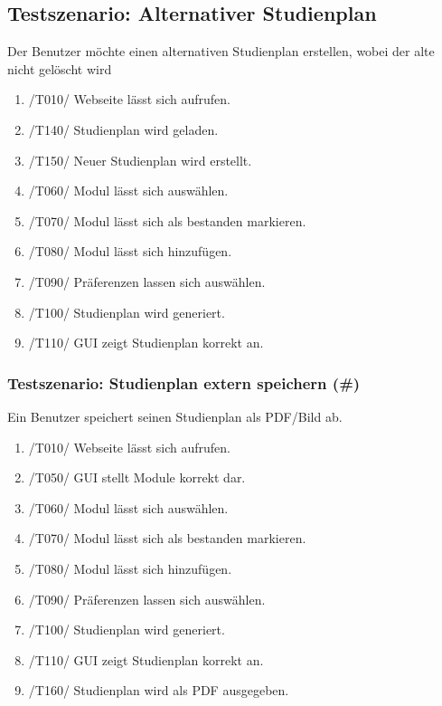 \documentclass[parskip=full]{scrartcl}
\begin{document}
		\subsection{Testszenario: Alternativer Studienplan}
		
			Der Benutzer möchte einen alternativen Studienplan erstellen, wobei der alte nicht gelöscht wird

			\begin{enumerate}
				\item /T010/ Webseite lässt sich aufrufen.
				\item /T140/ Studienplan wird geladen.
				\item /T150/ Neuer Studienplan wird erstellt.
				\item /T060/ Modul lässt sich auswählen.
				\item /T070/ Modul lässt sich als bestanden markieren.
				\item /T080/ Modul lässt sich hinzufügen.
				\item /T090/ Präferenzen lassen sich auswählen.
				\item /T100/ Studienplan wird generiert.
				\item /T110/ GUI zeigt Studienplan korrekt an.
			\end{enumerate}
			
		\subsubsection{Testszenario: Studienplan extern speichern (\#)}
	
			Ein Benutzer speichert seinen Studienplan als PDF/Bild ab.
	
			\begin{enumerate}
				\item /T010/ Webseite lässt sich aufrufen.
				\item /T050/ GUI stellt Module korrekt dar.
				\item /T060/ Modul lässt sich auswählen.
				\item /T070/ Modul lässt sich als bestanden markieren.
				\item /T080/ Modul lässt sich hinzufügen.
				\item /T090/ Präferenzen lassen sich auswählen.
				\item /T100/ Studienplan wird generiert.
				\item /T110/ GUI zeigt Studienplan korrekt an.
				\item /T160/ Studienplan wird als PDF ausgegeben.	
			\end{enumerate}
\end{document}
